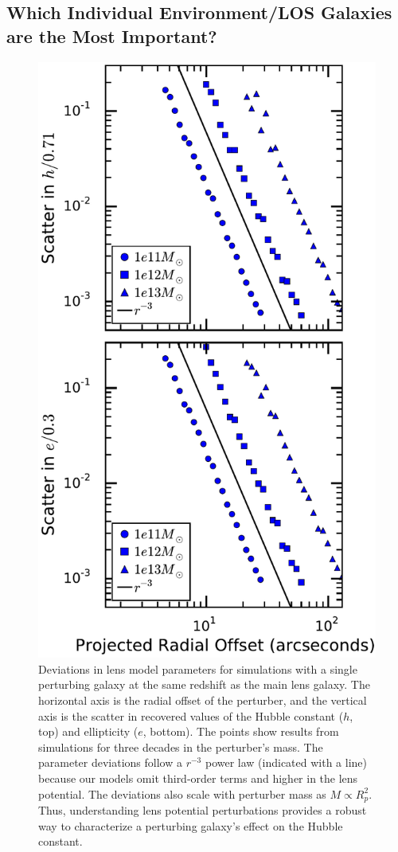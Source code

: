 \documentclass{emulateapj}
\begin{document}
\subsection{Which Individual Environment/LOS Galaxies are the Most Important?}
\label{sec:Individual}
\begin{figure}[t]
\begin{center}
\includegraphics[width=\columnwidth]{toymass_compare.pdf}
\caption{\label{fig:toyr3} Deviations in lens model parameters for simulations with a single perturbing galaxy at the same redshift as the main lens galaxy.  The horizontal axis is the radial offset of the perturber, and the vertical axis is the scatter in recovered values of the Hubble constant ($h$, top) and ellipticity ($e$, bottom). The points show results from simulations for three decades in the perturber's mass. The parameter deviations follow a $r^{-3}$ power law (indicated with a line) because our models omit third-order terms and higher in the lens potential. The deviations also scale with perturber mass as $M \propto R_p^2$. Thus, understanding lens potential perturbations provides a robust way to characterize a perturbing galaxy's effect on the Hubble constant.%
}
\end{center}
\end{figure}
\end{document}
